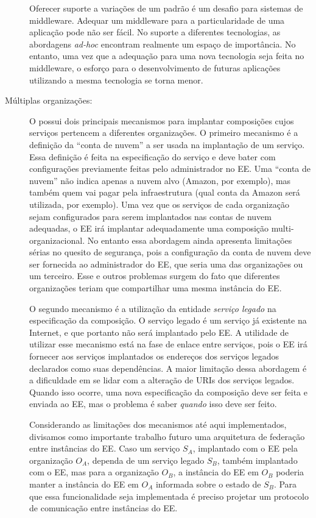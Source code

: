 \begin{description}
Oferecer suporte a variações de um padrão é um desafio para sistemas de middleware.
Adequar um middleware para a particularidade de uma aplicação pode não ser fácil.
No suporte a diferentes tecnologias, as abordagens \emph{ad-hoc} encontram realmente um espaço de importância.
No entanto, uma vez que a adequação para uma nova tecnologia seja feita no middleware,
o esforço para o desenvolvimento de futuras aplicações utilizando a mesma tecnologia
se torna menor.

\item [Múltiplas organizações:]

O \ee possui dois principais mecanismos para implantar composições cujos serviços
pertencem a diferentes organizações.
O primeiro mecanismo é a definição da ``conta de nuvem'' a ser usada na implantação de um serviço.
Essa definição é feita na especificação do serviço e deve bater com configurações
previamente feitas pelo administrador no EE.
Uma ``conta de nuvem'' não indica apenas a nuvem alvo (Amazon, por exemplo),
mas também quem vai pagar pela infraestrutura (qual conta da Amazon será utilizada, por exemplo).
Uma vez que os serviços de cada organização sejam configurados para serem implantados
nas contas de nuvem adequadas, o EE irá implantar adequadamente uma composição
multi-organizacional.
No entanto essa abordagem ainda apresenta limitações sérias no quesito de segurança,
pois a configuração da conta de nuvem deve ser fornecida ao administrador do EE,
que seria uma das organizações ou um terceiro.
Esse e outros problemas surgem do fato que diferentes organizações teriam que
compartilhar uma mesma instância do EE.

O segundo mecanismo é a utilização da entidade \emph{serviço legado} na especificação da composição.
O serviço legado é um serviço já existente na Internet, e que portanto
não será implantado pelo EE.
A utilidade de utilizar esse mecanismo está na fase de enlace
entre serviços, pois o EE irá fornecer
aos serviços implantados os endereços dos serviços legados declarados como suas dependências.
A maior limitação dessa abordagem é a dificuldade em se lidar com a alteração de URIs
dos serviços legados.
Quando isso ocorre, uma nova especificação da composição deve ser feita e enviada ao EE,
mas o problema é saber \emph{quando} isso deve ser feito.

Considerando as limitações dos mecanismos até aqui implementados,
divisamos como importante trabalho futuro uma arquitetura de federação entre instâncias do EE.
Caso um serviço $S_A$, implantado com o EE pela organização $O_A$, dependa de um serviço legado $S_B$,
também implantado com o EE, mas para a organização $O_B$, a instância do EE em $O_B$ poderia
manter a instância do EE em $O_A$ informada sobre o estado de $S_B$.
Para que essa funcionalidade seja implementada é preciso projetar um protocolo
de comunicação entre instâncias do EE.


\end{description}
